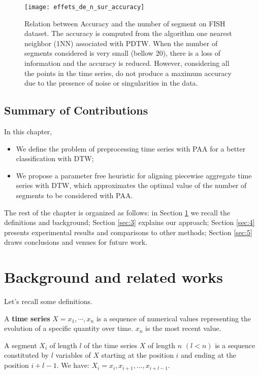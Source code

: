 \begin{figure}
\center
\texttt{[image: effets\_de\_n\_sur\_accuracy]}
\caption{Relation between Accuracy and the number of segment on FISH dataset. The accuracy is computed from the algorithm one nearest neighbor (1NN) associated with PDTW. When the number of segments
considered is very small (bellow 20), there is a loss of information and the accuracy is reduced. However, considering all the points in the time series, do not produce a maximum accuracy due to the presence of noise or singularities \cite{Keogh_Pazzani_2001}  in the data. }
\label{relation_nb_acc}
\end{figure}

\subsection{Summary of Contributions}

In this chapter, 
\begin{itemize}
\item We define the problem of preprocessing time series with PAA for a better classification with
DTW;
\item We propose a parameter free heuristic for aligning piecewise aggregate time series with DTW, which approximates the optimal value of the number of segments to be considered with PAA. 
\end{itemize}

The rest of the chapter is organized as follows: in Section
\ref{sec:1} we recall the definitions and background; Section \ref{sec:3} explains our approach;
Section \ref{sec:4} presents experimental results and comparisons to other methods; Section
\ref{sec:5} draws conclusions and venues for future work.   




\section{Background and related works}
\label{sec:1}
Let's recall some definitions.

\begin{definition}
A \textbf{time series}
$X=x_{1},\cdots,x_{n}$ is a sequence of numerical values representing the evolution of a specific quantity over time. $x_{n}$ is the most recent value.
\end{definition}

\begin{definition}
A segment  $X_{i}$ of length  $l$ of the time series $X$ of length $n$
$(l<n)$ is a sequence constituted by $l$  variables of $X$ starting at the position $i$ and ending at the position $i+l-1$.
We have: $X_{i}=x_{i},x_{i+1},...,x_{i+l-1}$.
\end{definition}

